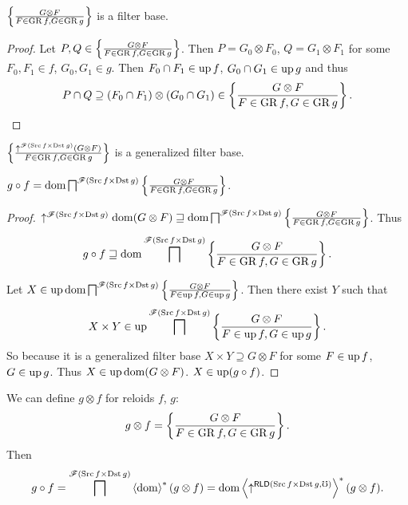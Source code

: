 \begin{lem}
$\setcond{G\otimes F}{F\in\GR f,G\in\GR g}$ is a filter base.\end{lem}
\begin{proof}
Let $P,Q\in\setcond{G\otimes F}{F\in\GR f,G\in\GR g}$. Then $P=G_{0}\otimes F_{0}$,
$Q=G_{1}\otimes F_{1}$ for some $F_{0},F_{1}\in f$, $G_{0},G_{1}\in g$.
Then $F_{0}\cap F_{1}\in\up f$, $G_{0}\cap G_{1}\in\up g$ and thus
\[
P\cap Q\supseteq(F_{0}\cap F_{1})\otimes(G_{0}\cap G_{1})\in\setcond{G\otimes F}{F\in\GR f,G\in\GR g}.
\]
\end{proof}
\begin{cor}
$\setcond{\uparrow^{\mathscr{F}(\Src f\times\Dst g)}(G\otimes F)}{F\in\GR f,G\in\GR g}$
is a generalized filter base.\end{cor}
\begin{prop}
$g\circ f=\dom\bigsqcap^{\mathscr{F}(\Src f\times\Dst g)}\setcond{G\otimes F}{F\in\GR f,G\in\GR g}$.\end{prop}
\begin{proof}
$\uparrow^{\mathscr{F}(\Src f\times\Dst g)}\dom(G\otimes F)\sqsupseteq\dom\bigsqcap^{\mathscr{F}(\Src f\times\Dst g)}\setcond{G\otimes F}{F\in\GR f,G\in\GR g}$.
Thus
\[
g\circ f\sqsupseteq\dom\bigsqcap^{\mathscr{F}(\Src f\times\Dst g)}\setcond{G\otimes F}{F\in\GR f,G\in\GR g}.
\]


Let $X\in\up\dom\bigsqcap^{\mathscr{F}(\Src f\times\Dst g)}\setcond{G\otimes F}{F\in\up f,G\in\up g}$.
Then there exist $Y$ such that
\[
X\times Y\in\up\bigsqcap^{\mathscr{F}(\Src f\times\Dst g)}\setcond{G\otimes F}{F\in\up f,G\in\up g}.
\]
So because it is a generalized filter base $X\times Y\supseteq G\otimes F$
for some $F\in\up f$, $G\in\up g$. Thus $X\in\up\dom(G\otimes F)$.
$X\in\up(g\circ f)$.
\end{proof}
We can define $g\otimes f$ for reloids $f$, $g$:
\[
g\otimes f=\setcond{G\otimes F}{F\in\GR f,G\in\GR g}.
\]
Then
\[
g\circ f=\bigsqcap^{\mathscr{F}(\Src f\times\Dst g)}\rsupfun{\dom}(g\otimes f)=\dom\rsupfun{\uparrow^{\mathsf{RLD}(\Src f\times\Dst g,\mho)}}(g\otimes f).
\]



